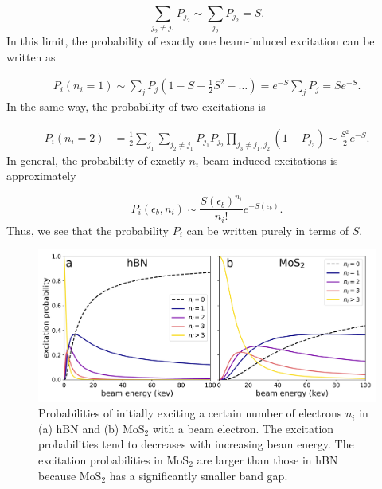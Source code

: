 \documentclass{article}
\begin{document}
\begin{equation}
  \sum_{j_2\neq j_1}P_{j_2}
  \sim
  \sum_{j_2}P_{j_2}
  =
  S.
\end{equation}
%
In this limit, the probability of exactly one beam-induced excitation can be
written as

\begin{equation}
  \begin{aligned}
  P_i(n_i=1)
  \sim
  \sum_j P_j
  \left( 1 - S + \frac{1}{2}S^2 - \dots \right)
  =
  e^{-S}\sum_j P_j
  =
  Se^{-S}.
\end{aligned}
\label{eq:Pi(1)}
\end{equation}
%
In the same way, the probability of two excitations is

\begin{equation}
\begin{aligned}
  P_i(n_i=2)
  &=
  \frac{1}{2} \sum_{j_1} \sum_{j_2\neq j_1} P_{j_1} P_{j_2}
  \prod_{j_3\neq j_1,j_2} (1 - P_{j_3})
  \sim
  \frac{S^2}{2}e^{-S}.
\end{aligned}
\end{equation}
%
In general, the probability of exactly $n_i$ beam-induced excitations is
approximately

\begin{equation}
  P_i(\epsilon_b, n_i)
  \sim
  \frac{S(\epsilon_b)^{n_i}}{n_i!}
  e^{-S(\epsilon_b)}.
  \label{eq:Pi}
\end{equation}
%
Thus, we see that the probability $P_i$ can be written purely in terms of $S$.

\begin{figure}
  \centering
  \includegraphics[width=.9\textwidth]{fig3.pdf}
  \caption{
    Probabilities of initially exciting a certain number of electrons $n_i$ in
    (a) hBN and (b) MoS$_2$ with a beam electron.
    The excitation probabilities tend to decreases with increasing beam energy.
    The excitation probabilities in MoS$_2$ are larger than those in hBN
    because MoS$_2$ has a significantly smaller band gap.
  } 
  \label{fig:Pi}
\end{figure}
\end{document}

